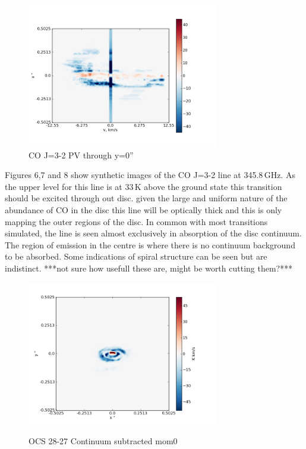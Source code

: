 \documentclass[useAMS,usenatbib]{mn2e}
\begin{document}
\begin{figure}[H]
 \includegraphics[width=84mm]{Figures/sim/imageCO_3-2_30deg_PV_centre.png}

 \caption{CO J=3-2 PV through y=0''}
\end{figure}

Figures 6,7 and 8 show synthetic images of the CO J=3-2 line at 345.8$\,$GHz. As the upper level for this line is at 33$\,$K above the ground state this transition should be excited through out disc. given the large and uniform nature of the abundance of CO in the disc this line will be optically thick and this is only mapping the outer regions of the disc. In common with most transitions simulated, the line is seen almost exclusively in absorption of the disc continuum. The region of emission in the centre is where there is no continuum background to be absorbed.  Some indications of spiral structure can be seen but are indistinct. ***not sure how usefull these are, might be worth cutting them?***\newline



\begin{figure}[H]
 \includegraphics[width=84mm]{Figures/sim/imageOCS_28-27_30deg_composite_contSub.png}
 \label{OCS_mom0}
 \caption{OCS 28-27 Continuum subtracted mom0}
\end{figure}
\end{document}
